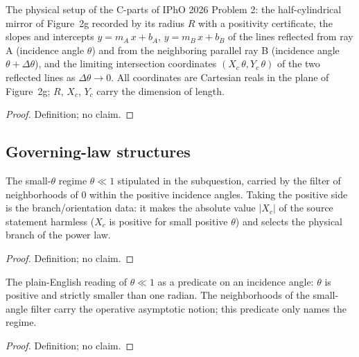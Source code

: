 \begin{definition}
\label{def:IPhO2026Problems_problem_IPhO_2026_2_C_4:HalfCylindricalMirrorCaustic}
The physical setup of the C-parts of IPhO 2026 Problem 2: the
half-cylindrical mirror of Figure~2g recorded by its radius $R$ with a
positivity certificate, the slopes and intercepts
$y = m_A\,x + b_A$, $y = m_B\,x + b_B$ of the lines reflected from ray A
(incidence angle $\theta$) and from the neighboring parallel ray B
(incidence angle $\theta + \Delta\theta$), and the limiting intersection
coordinates $(X_c\,\theta, Y_c\,\theta)$ of the two reflected lines as
$\Delta\theta \to 0$.  All coordinates are Cartesian reals in the plane of
Figure~2g; $R$, $X_c$, $Y_c$ carry the dimension of length.
\end{definition}
\begin{proof}
Definition; no claim.
\end{proof}

\subsection*{Governing-law structures}

\begin{definition}
\label{def:IPhO2026Problems_problem_IPhO_2026_2_C_4:smallAngleFilter}
The small-$\theta$ regime $\theta \ll 1$ stipulated in the subquestion,
carried by the filter of neighborhoods of $0$ within the positive
incidence angles.  Taking the positive side is the branch/orientation data:
it makes the absolute value $|X_c|$ of the source statement harmless ($X_c$
is positive for small positive $\theta$) and selects the physical branch of
the power law.
\end{definition}
\begin{proof}
Definition; no claim.
\end{proof}

\begin{definition}
\label{def:IPhO2026Problems_problem_IPhO_2026_2_C_4:InSmallAngleRegime}
The plain-English reading of $\theta \ll 1$ as a predicate on an incidence
angle: $\theta$ is positive and strictly smaller than one radian.  The
neighborhoods of the small-angle filter carry the operative asymptotic
notion; this predicate only names the regime.
\end{definition}
\begin{proof}
Definition; no claim.
\end{proof}


